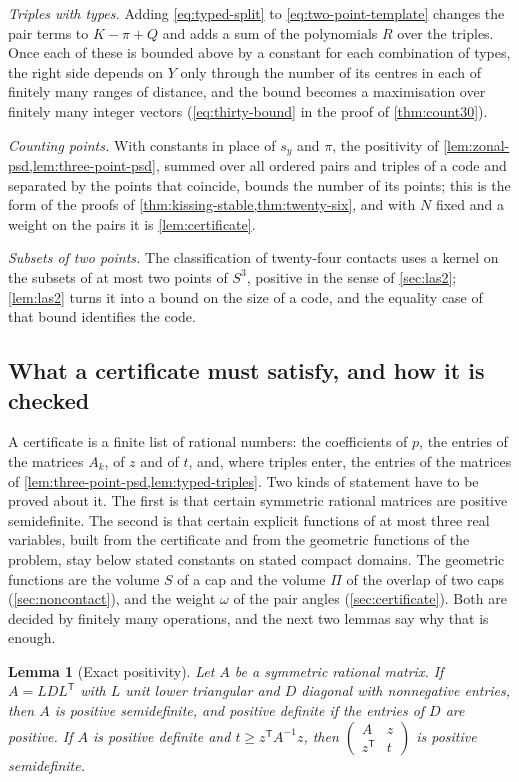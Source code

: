 \documentclass[11pt,reqno]{amsart}
\renewcommand{\_}{\origunderscore\allowbreak}
\numberwithin{equation}{section}
\theoremstyle{plain}
\newtheorem{lem}[thm]{Lemma}
\theoremstyle{definition}
\theoremstyle{remark}
\begin{document}
\emph{Triples with types.} Adding \eqref{eq:typed-split} to
\eqref{eq:two-point-template} changes the pair terms to
$K-\pi+Q$ and adds a sum of the polynomials $R$ over the triples. Once
each of these is bounded above by a constant for each combination of
types, the right side depends on $Y$ only through the number of its
centres in each of finitely many ranges of distance, and the bound
becomes a maximisation over finitely many integer vectors
(\eqref{eq:thirty-bound} in the proof of \cref{thm:count30}).

\emph{Counting points.} With constants in place of $s_y$ and $\pi$, the
positivity of \cref{lem:zonal-psd,lem:three-point-psd}, summed over all
ordered pairs and triples of a code and separated by the points that
coincide, bounds the number of its points; this is the form of the proofs
of \cref{thm:kissing-stable,thm:twenty-six}, and with $N$ fixed and a weight
on the pairs it is \cref{lem:certificate}.

\emph{Subsets of two points.} The classification of twenty-four contacts
uses a kernel on the subsets of at most two points of $S^3$, positive in
the sense of \cref{sec:las2}; \cref{lem:las2} turns it into a bound on the
size of a code, and the equality case of that bound identifies the code.

\subsection{What a certificate must satisfy, and how it is checked}\label{sec:kernels-check}

A certificate is a finite list of rational numbers: the coefficients of
$p$, the entries of the matrices $A_k$, of $z$ and of $t$, and, where
triples enter, the entries of the matrices of
\cref{lem:three-point-psd,lem:typed-triples}. Two kinds of statement
have to be proved about it. The first is that certain symmetric rational
matrices are positive semidefinite. The second is that certain explicit
functions of at most three real variables, built from the certificate and
from the geometric functions of the problem, stay below stated constants
on stated compact domains. The geometric functions are the volume $S$ of a
cap and the volume $\Pi$ of the overlap of two caps
(\cref{sec:noncontact}), and the weight $\omega$ of the pair angles
(\cref{sec:certificate}). Both are decided by finitely many
operations, and the next two lemmas say why that is enough.

\begin{lem}[Exact positivity]\label{lem:exact-psd}
Let $A$ be a symmetric rational matrix. If $A=LDL^{\mathsf T}$ with $L$
unit lower triangular and $D$ diagonal with nonnegative entries, then $A$
is positive semidefinite, and positive definite if the entries of $D$ are
positive. If $A$ is positive definite and
$t\ge z^{\mathsf T}A^{-1}z$, then
$\begin{pmatrix}A&z\\ z^{\mathsf T}&t\end{pmatrix}$ is positive
semidefinite.
\end{lem}
\end{document}
